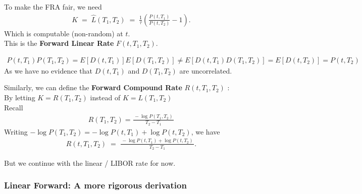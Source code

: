     \begin{definition}
    To make the FRA fair, we need 
    \begin{align}
        K \;=\; \hat{L}(T_1, T_2) \;=\; \frac{1}{\tau} \left( \frac{P(t, T_1)}{P(t, T_2)} - 1 \right).
        \label{eq:forward_rate}
    \end{align}
    Which is computable (non-random) at \(t\).\\
    This is the \textbf{Forward Linear Rate} $ F(t, T_1, T_2) $.\\

    \begin{remark}
        \begin{align*}
            P(t, T_1) P(T_1, T_2) = E[D(t, T_1)] E[ D(T_1, T_2)] \neq
            E[D(t, T_1) D(T_1, T_2)] = E[D(t, T_2)] = P(t, T_2)
        \end{align*}
        As we have no evidence that $D(t, T_1)$ and $D(T_1, T_2)$ are uncorrelated.
    \end{remark}
    \end{definition}
    \begin{definition}
    Similarly, we can define the \textbf{Forward Compound Rate} $ R(t, T_1, T_2) $ :\\
    By letting $ K = R(T_1, T_2) $ instead of $ K = L(T_1, T_2) $\\
    Recall
    \begin{align*}
        R(T_1, T_2) = \frac{\,-\log P(T_1, T_2)\,}{\,T_2 - T_1\,}
    \end{align*}
    Writing $ -\log P(T_1, T_2) = -\log P(t, T_1) + \log P(t, T_2) $, we have
    \begin{align}
        R(t, T_1, T_2) \;=\; \frac{\,-\log P(t, T_1) + \log P(t, T_2)\,}{\,T_2 - T_1\,}.
    \label{eq:forward_compound_rate}
    \end{align}
    \end{definition}
    But we continue with the linear / LIBOR rate for now.

    \subsubsection{Linear Forward: A more rigorous derivation}


